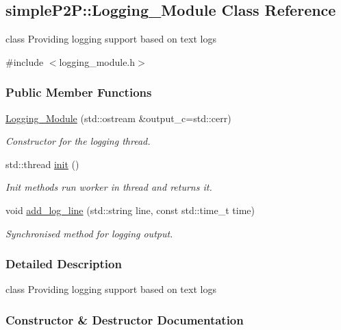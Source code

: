 \hypertarget{classsimpleP2P_1_1Logging__Module}{}\subsection{simple\+P2P\+:\+:Logging\+\_\+\+Module Class Reference}
\label{classsimpleP2P_1_1Logging__Module}


class Providing logging support based on text logs  




{\ttfamily \#include $<$logging\+\_\+module.\+h$>$}

\subsubsection*{Public Member Functions}
\begin{DoxyCompactItemize}
\item 
\hyperlink{classsimpleP2P_1_1Logging__Module_a300ea6b6f0c06caa7891c2226fecf67b}{Logging\+\_\+\+Module} (std\+::ostream \&output\+\_\+c=std\+::cerr)
\begin{DoxyCompactList}\small\item\em Constructor for the logging thread. \end{DoxyCompactList}\item 
std\+::thread \hyperlink{classsimpleP2P_1_1Logging__Module_a57e92e151320fd7c811689d831498b6a}{init} ()
\begin{DoxyCompactList}\small\item\em Init methods run worker in thread and returns it. \end{DoxyCompactList}\item 
void \hyperlink{classsimpleP2P_1_1Logging__Module_a5f1eb6d6c66d406f02ae4093cc7657ec}{add\+\_\+log\+\_\+line} (std\+::string line, const std\+::time\+\_\+t time)
\begin{DoxyCompactList}\small\item\em Synchronised method for logging output. \end{DoxyCompactList}\end{DoxyCompactItemize}


\subsubsection{Detailed Description}
class Providing logging support based on text logs 

\subsubsection{Constructor \& Destructor Documentation}
\mbox{\label{classsimpleP2P_1_1Logging__Module_a300ea6b6f0c06caa7891c2226fecf67b}} 
